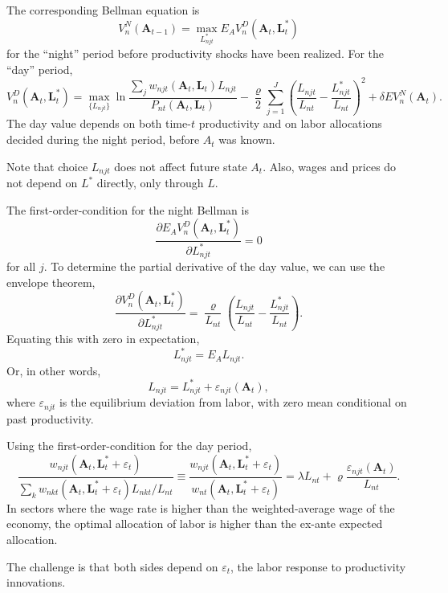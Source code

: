 \documentclass[12pt]{article}
\begin{document}
The corresponding Bellman equation is
\begin{equation}
	V_n^N(\mathbf A_{t-1}) = 
	\max_{L_{njt}^*}
	E_{A} V_n^D(\mathbf A_{t}, \mathbf L_{t}^*)
\end{equation}
for the ``night'' period before productivity shocks have been realized. For the ``day'' period,
\begin{equation}
	V_n^D(\mathbf A_{t}, \mathbf L_{t}^*) = 
	\max_{\{L_{njt}\}}
		\ln \frac 
			{\sum_j w_{njt}(\mathbf A_{t}, \mathbf L_{t})L_{njt}}
			{P_{nt}(\mathbf A_{t}, \mathbf L_{t})}
		-\frac \varrho 2
			\sum_{j=1}^J
			\left(
				\frac {L_{njt}} {L_{nt}}
				- 
				\frac {L_{njt}^*} {L_{nt}}
			\right)^2
	+ \delta E V_n^N(\mathbf A_{t}).
\end{equation}
The day value depends on both time-$t$ productivity and on labor allocations decided during the night period, before $A_t$ was known.

Note that choice $L_{njt}$ does not affect future state $A_t$. Also, wages and prices do not depend on $L^*$ directly, only through $L$.

The first-order-condition for the night Bellman is
\[
\frac 
	{\partial E_{A} V_n^D(\mathbf A_{t}, \mathbf L_{t}^*)}
	{\partial L_{njt}^*}
	= 0
\]
for all $j$. To determine the partial derivative of the day value, we can use the envelope theorem,
\[
\frac 
	{\partial V_n^D(\mathbf A_{t}, \mathbf L_{t}^*)}
	{\partial L_{njt}^*}
	= 
	\frac \varrho {L_{nt}}
	\left(
				\frac {L_{njt}} {L_{nt}}
				- 
				\frac {L_{njt}^*} {L_{nt}}
	\right).
\]
Equating this with zero in expectation,
\[
L_{njt}^* = E_{A} L_{njt}.
\]
Or, in other words,
\[
L_{njt} = L_{njt}^* + \varepsilon_{njt}(\mathbf A_t),
\]
where $\varepsilon_{njt}$ is the equilibrium deviation from labor, with zero mean conditional on past productivity.

Using the first-order-condition for the day period,
\[
\frac 
	{w_{njt}(\mathbf A_{t}, \mathbf L_{t}^*+\varepsilon_t)}
	{\sum_k w_{nkt}(\mathbf A_{t}, \mathbf L_{t}^*+\varepsilon_t)L_{nkt}/L_{nt}}
\equiv 
\frac 
	{w_{njt}(\mathbf A_{t}, \mathbf L_{t}^*+\varepsilon_t)}
	{w_{nt}(\mathbf A_{t}, \mathbf L_{t}^*+\varepsilon_t)}
= \lambda L_{nt}+
		\varrho 
				\frac {\varepsilon_{njt}(\mathbf A_t)} {L_{nt}}
.
\]
In sectors where the wage rate is higher than the weighted-average wage of the economy, the optimal allocation of labor is higher than the ex-ante expected allocation.

The challenge is that both sides depend on $\varepsilon_t$, the labor response to productivity innovations.
\end{document}
